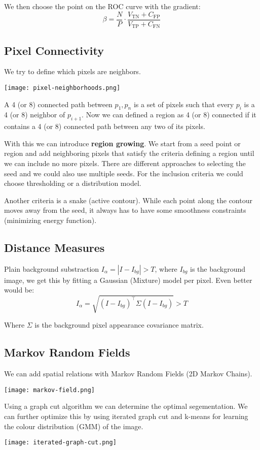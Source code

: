 We then choose the point on the ROC curve with the gradient:
$$\beta = \frac{N}{P} \cdot \frac{V_{\text{TN}} + C_{\text{FP}}}{V_{\text{TP}} + C_{\text{FN}}}$$


\subsection{Pixel Connectivity}

We try to define which pixels are neighbors.

\begin{center}
	\texttt{[image: pixel-neighborhoods.png]}
\end{center}

A 4 (or 8) connected path between $p_1, p_n$ is a set of pixels such that every $p_i$ is a 4 (or 8) neighbor of $p_{i+1}$. Now we can defined a region as 4 (or 8) connected if it contains a 4 (or 8) connected path between any two of its pixels.

With this we can introduce \textbf{region growing}. We start from a seed point or region and add neighboring pixels that satisfy the criteria defining a region until we can include no more pixels. There are different approaches to selecting the seed and we could also use multiple seeds. For the inclusion criteria we could choose thresholding or a distribution model.

Another criteria is a snake (active contour). While each point along the contour moves away from the seed, it always has to have some smoothness constraints (minimizing energy function).


\subsection{Distance Measures}

Plain background substraction $I_\alpha = |I - I_{bg}| > T$, where $I_{bg}$ is the background image, we get this by fitting a Gaussian (Mixture) model per pixel. Even better would be:
$$I_\alpha = \sqrt{(I - I_{bg})^\top \Sigma (I - I_{bg})} > T$$

Where $\Sigma$ is the background pixel appearance covariance matrix.


\subsection{Markov Random Fields}

We can add spatial relations with Markov Random Fields (2D Markov Chains).

\begin{center}
	\texttt{[image: markov-field.png]}
\end{center}

Using a graph cut algorithm we can determine the optimal segementation. We can further optimize this by using iterated graph cut and k-means for learning the colour distribution (GMM) of the image.

\begin{center}
	\texttt{[image: iterated-graph-cut.png]}
\end{center}
